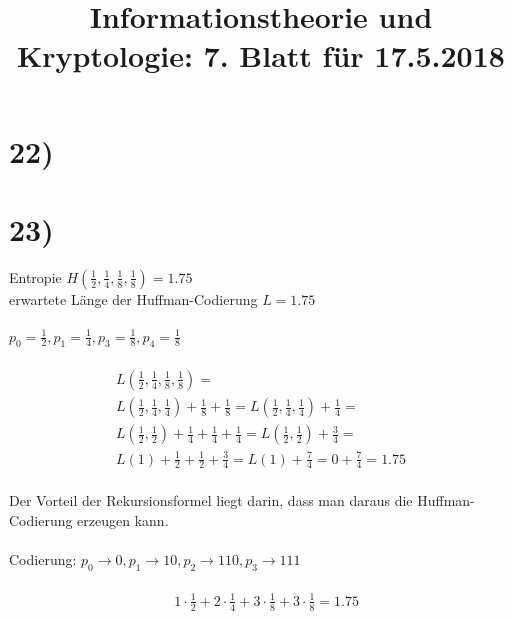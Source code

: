 %



  \title{Informationstheorie und Kryptologie: 7. Blatt für 17.5.2018}
  \maketitle

  \section*{22)}

  

  \section*{23)}

  Entropie $H(\frac{1}{2}, \frac{1}{4}, \frac{1}{8}, \frac{1}{8}) = 1.75$\\
  erwartete Länge der Huffman-Codierung $L = 1.75$\\
  \\
  $p_0 = \frac{1}{2}, p_1 = \frac{1}{4}, p_3 = \frac{1}{8}, p_4 = \frac{1}{8}$\\
  \\
  \begin{align*}
    & L(\frac{1}{2}, \frac{1}{4}, \frac{1}{8}, \frac{1}{8}) = &\\
    & L(\frac{1}{2}, \frac{1}{4}, \frac{1}{4}) + \frac{1}{8} + \frac{1}{8} = L(\frac{1}{2}, \frac{1}{4}, \frac{1}{4}) + \frac{1}{4} =\\
    & L(\frac{1}{2}, \frac{1}{2}) + \frac{1}{4} + \frac{1}{4} + \frac{1}{4} = L(\frac{1}{2}, \frac{1}{2}) + \frac{3}{4} =\\
    & L(1) + \frac{1}{2} + \frac{1}{2} + \frac{3}{4} = L(1) + \frac{7}{4} = 0 + \frac{7}{4} = 1.75
  \end{align*}
  \\
  Der Vorteil der Rekursionsformel liegt darin, dass man daraus die Huffman-Codierung erzeugen kann.\\
  \\
  Codierung: $p_0 \rightarrow 0, p_1 \rightarrow 10, p_2 \rightarrow 110, p_3 \rightarrow 111$\\
  \\
  \begin{align*}
    & 1 \cdot \frac{1}{2} + 2 \cdot \frac{1}{4} + 3 \cdot \frac{1}{8} + 3 \cdot \frac{1}{8} = 1.75
  \end{align*}

